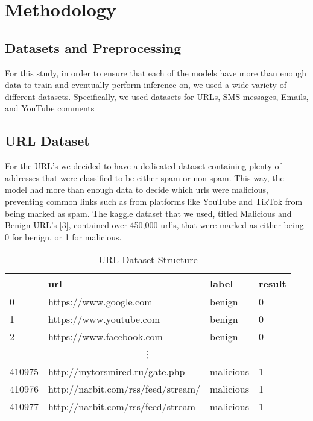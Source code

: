 \documentclass{article}
\begin{document}

\section{Methodology}


\subsection{Datasets and Preprocessing}

For this study, in order to ensure that each of the models have more than enough data to train and eventually perform inference on, we used a wide variety of different datasets. Specifically, we used datasets for URLs, SMS messages, Emails, and YouTube comments

\subsection*{URL Dataset}

For the URL’s we decided to have a dedicated dataset containing plenty of addresses that were classified to be either spam or non spam. This way, the model had more than enough data to decide which urls were malicious, preventing common links such as from platforms like YouTube and TikTok from being marked as spam. The kaggle dataset that we used, titled Malicious and Benign URL’s [3], contained over 450,000 url’s, that were marked as either being 0 for benign, or 1 for malicious. 

\begin{table}[htbp]
    \centering
    \caption{URL Dataset Structure}
    \begin{tabular}{llll}
    \toprule
     & url & label & result \\
    \midrule
    0 & https://www.google.com & benign & 0 \\
    1 & https://www.youtube.com & benign & 0 \\
    2 & https://www.facebook.com & benign & 0 \\
    \multicolumn{4}{c}{\vdots} \\ %
    410975 & http://mytorsmired.ru/gate.php & malicious & 1 \\
    410976 & http://narbit.com/rss/feed/stream/ & malicious & 1 \\
    410977 & http://narbit.com/rss/feed/stream & malicious & 1 \\
    \bottomrule
    \end{tabular}
    \label{tab:csv_sample}
\end{table}
\end{document}
